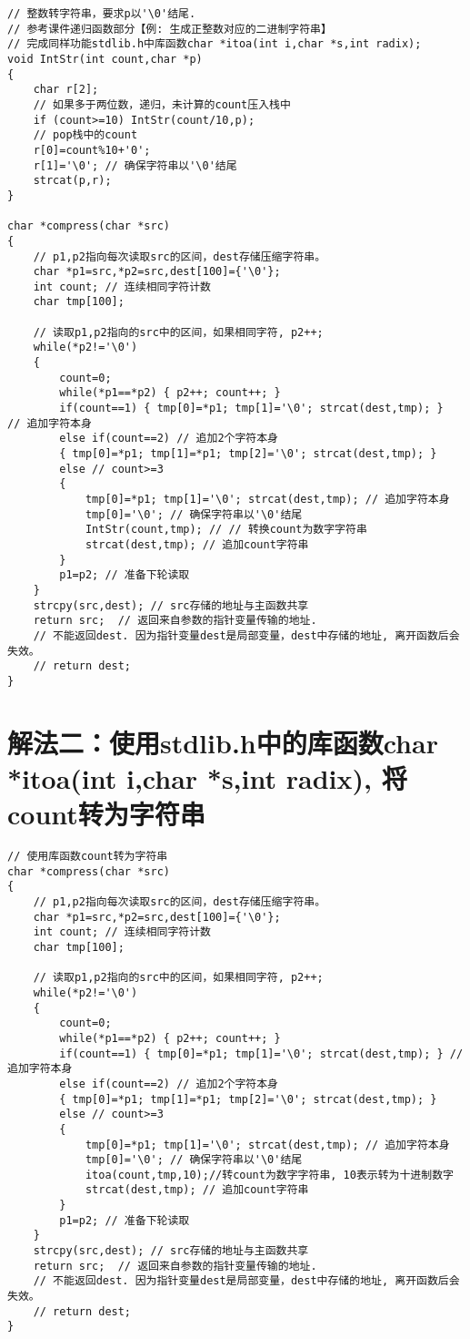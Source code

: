 \begin{lstlisting}
// 整数转字符串，要求p以'\0'结尾. 
// 参考课件递归函数部分【例: 生成正整数对应的二进制字符串】 
// 完成同样功能stdlib.h中库函数char *itoa(int i,char *s,int radix);  
void IntStr(int count,char *p)
{
	char r[2];
	// 如果多于两位数，递归，未计算的count压入栈中 
	if (count>=10) IntStr(count/10,p); 
	// pop栈中的count 
	r[0]=count%10+'0'; 
	r[1]='\0'; // 确保字符串以'\0'结尾  
	strcat(p,r); 
}

char *compress(char *src)
{
	// p1,p2指向每次读取src的区间，dest存储压缩字符串。 
	char *p1=src,*p2=src,dest[100]={'\0'};
	int count; // 连续相同字符计数 
	char tmp[100];
	
	// 读取p1,p2指向的src中的区间，如果相同字符, p2++; 
	while(*p2!='\0')
	{
		count=0;
		while(*p1==*p2)	{ p2++; count++; }
		if(count==1) { tmp[0]=*p1; tmp[1]='\0'; strcat(dest,tmp); }  // 追加字符本身 
		else if(count==2) // 追加2个字符本身 
		{ tmp[0]=*p1; tmp[1]=*p1; tmp[2]='\0'; strcat(dest,tmp); }
		else // count>=3 
		{
			tmp[0]=*p1; tmp[1]='\0'; strcat(dest,tmp); // 追加字符本身
			tmp[0]='\0'; // 确保字符串以'\0'结尾  
			IntStr(count,tmp); // // 转换count为数字字符串
			strcat(dest,tmp); // 追加count字符串 
		}
		p1=p2; // 准备下轮读取 
	}
	strcpy(src,dest); // src存储的地址与主函数共享 
	return src;  // 返回来自参数的指针变量传输的地址.
	// 不能返回dest. 因为指针变量dest是局部变量，dest中存储的地址, 离开函数后会失效。 
	// return dest;  
}
\end{lstlisting}

\section{解法二：使用stdlib.h中的库函数char *itoa(int i,char *s,int radix), 将count转为字符串}

\begin{lstlisting}
// 使用库函数count转为字符串 
char *compress(char *src)
{
	// p1,p2指向每次读取src的区间，dest存储压缩字符串。 
	char *p1=src,*p2=src,dest[100]={'\0'};
	int count; // 连续相同字符计数 
	char tmp[100];
	
	// 读取p1,p2指向的src中的区间，如果相同字符, p2++; 
	while(*p2!='\0')
	{
		count=0;
		while(*p1==*p2) { p2++; count++; }
		if(count==1) { tmp[0]=*p1; tmp[1]='\0'; strcat(dest,tmp); } // 追加字符本身 
		else if(count==2) // 追加2个字符本身 
		{ tmp[0]=*p1; tmp[1]=*p1; tmp[2]='\0'; strcat(dest,tmp); }
		else // count>=3 
		{
			tmp[0]=*p1; tmp[1]='\0'; strcat(dest,tmp); // 追加字符本身 
			tmp[0]='\0'; // 确保字符串以'\0'结尾  
			itoa(count,tmp,10);//转count为数字字符串, 10表示转为十进制数字 
			strcat(dest,tmp); // 追加count字符串 
		}
		p1=p2; // 准备下轮读取 
	}
	strcpy(src,dest); // src存储的地址与主函数共享 
	return src;  // 返回来自参数的指针变量传输的地址.
	// 不能返回dest. 因为指针变量dest是局部变量，dest中存储的地址, 离开函数后会失效。 
	// return dest;  
}
\end{lstlisting}


